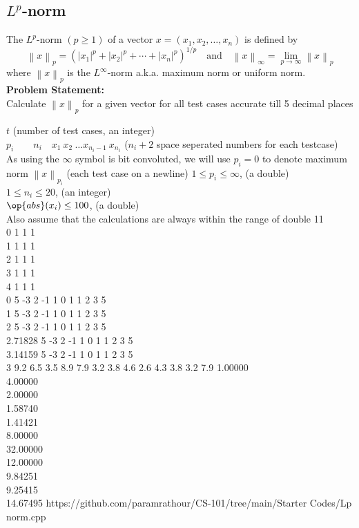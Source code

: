 \subsection{$L^p$-norm}
The $L^p$-norm $(p\geq1)$ of a vector $x = (x_1, x_2,\ldots, x_n)$ is defined by
\begin{equation}
{\displaystyle \left\|x\right\|_{p}=\left(|x_{1}|^{p}+|x_{2}|^{p}+\dotsb +|x_{n}|^{p}\right)^{1/p}\quad\text{and}\quad \left\|x\right\|_{\infty}=\displaystyle\lim_{p\rightarrow\infty}\left\|x\right\|_{p}}
\end{equation}
where $\left\|x\right\|_{p}$ is the $L^\infty$-norm a.k.a. maximum norm or uniform norm.\\
\textbf{Problem Statement:}\\
Calculate $\left\|x\right\|_p$ for a given vector for all test cases accurate till 5 decimal places
\begin{testcases}
	{$t$ \hfill(number of test cases, an integer)\\
	$p_i\qquad n_i\quad x_1\ x_2\ \ldots x_{n_i-1}\ x_{n_i}$ \hfill($n_i+2$ space seperated numbers for each testcase)\\
	As using the $\infty$ symbol is bit convoluted, we will use $p_i = 0$ to denote maximum norm}
	{$\left\|x\right\|_{p_i}$ \hfill{(each test case on a newline)}}
	{$1 \leq p_i \leq \infty$, \hfill{(a double)}\\
	$1 \leq n_i \leq 20$, \hfill{(an integer)}\\
	$\op{abs}(x_i) \leq 100$, \hfill{(a double)}\\
	Also assume that the calculations are always within the range of double}
	{11\\0 1 1 1\\1 1 1 1\\2 1 1 1\\3 1 1 1\\4 1 1 1\\0 5 -3 2 -1 1 0 1 1 2 3 5\\1 5 -3 2 -1 1 0 1 1 2 3 5\\2 5 -3 2 -1 1 0 1 1 2 3 5\\2.71828 5 -3 2 -1 1 0 1 1 2 3 5\\3.14159 5 -3 2 -1 1 0 1 1 2 3 5\\3 9.2 6.5 3.5 8.9 7.9 3.2 3.8 4.6 2.6 4.3 3.8 3.2 7.9}
	{1.00000\\4.00000\\2.00000\\1.58740\\1.41421\\8.00000\\32.00000\\12.00000\\9.84251\\9.25415\\14.67495}
	{https://github.com/paramrathour/CS-101/tree/main/Starter Codes/Lp norm.cpp}
\end{testcases}